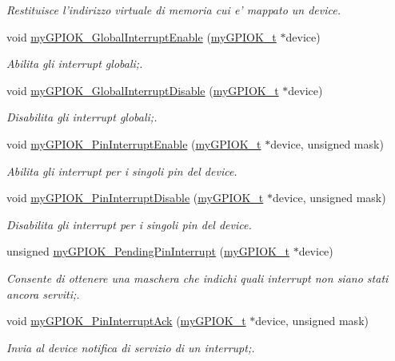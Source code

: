 \begin{DoxyCompactItemize}
\begin{DoxyCompactList}\small\item\em Restituisce l'indirizzo virtuale di memoria cui e' mappato un device. \end{DoxyCompactList}\item 
void \hyperlink{group___linux-_driver_gaf8da20aabceb02b9ea8132228c973368}{my\+G\+P\+I\+O\+K\+\_\+\+Global\+Interrupt\+Enable} (\hyperlink{structmy_g_p_i_o_k__t}{my\+G\+P\+I\+O\+K\+\_\+t} $\ast$device)
\begin{DoxyCompactList}\small\item\em Abilita gli interrupt globali;. \end{DoxyCompactList}\item 
void \hyperlink{group___linux-_driver_gad9275880dc4941d3d0ae93c45bf4cf79}{my\+G\+P\+I\+O\+K\+\_\+\+Global\+Interrupt\+Disable} (\hyperlink{structmy_g_p_i_o_k__t}{my\+G\+P\+I\+O\+K\+\_\+t} $\ast$device)
\begin{DoxyCompactList}\small\item\em Disabilita gli interrupt globali;. \end{DoxyCompactList}\item 
void \hyperlink{group___linux-_driver_gac63adbb81dcfa905341a9ea0bc6283b6}{my\+G\+P\+I\+O\+K\+\_\+\+Pin\+Interrupt\+Enable} (\hyperlink{structmy_g_p_i_o_k__t}{my\+G\+P\+I\+O\+K\+\_\+t} $\ast$device, unsigned mask)
\begin{DoxyCompactList}\small\item\em Abilita gli interrupt per i singoli pin del device. \end{DoxyCompactList}\item 
void \hyperlink{group___linux-_driver_gad600864a578b08a526f8955d3e9f6ca0}{my\+G\+P\+I\+O\+K\+\_\+\+Pin\+Interrupt\+Disable} (\hyperlink{structmy_g_p_i_o_k__t}{my\+G\+P\+I\+O\+K\+\_\+t} $\ast$device, unsigned mask)
\begin{DoxyCompactList}\small\item\em Disabilita gli interrupt per i singoli pin del device. \end{DoxyCompactList}\item 
unsigned \hyperlink{group___linux-_driver_ga3c78c03314722cfa7f32503ede4c29c4}{my\+G\+P\+I\+O\+K\+\_\+\+Pending\+Pin\+Interrupt} (\hyperlink{structmy_g_p_i_o_k__t}{my\+G\+P\+I\+O\+K\+\_\+t} $\ast$device)
\begin{DoxyCompactList}\small\item\em Consente di ottenere una maschera che indichi quali interrupt non siano stati ancora serviti;. \end{DoxyCompactList}\item 
void \hyperlink{group___linux-_driver_ga3c0591dacf65607a7e31a0bf9c9011ae}{my\+G\+P\+I\+O\+K\+\_\+\+Pin\+Interrupt\+Ack} (\hyperlink{structmy_g_p_i_o_k__t}{my\+G\+P\+I\+O\+K\+\_\+t} $\ast$device, unsigned mask)
\begin{DoxyCompactList}\small\item\em Invia al device notifica di servizio di un interrupt;. \end{DoxyCompactList}\end{DoxyCompactItemize}
